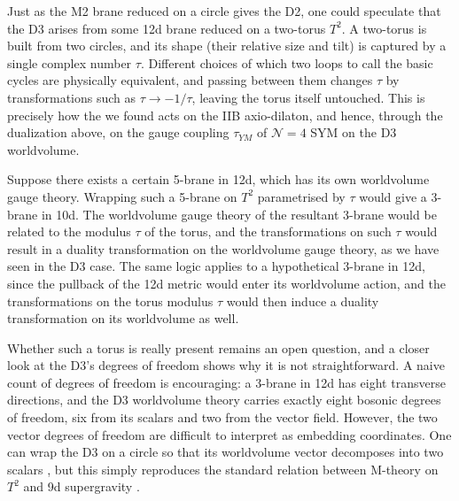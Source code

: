 Just as the M2 brane reduced on a circle gives the D2, one could speculate that the D3 arises from some 12d brane reduced on a two-torus $T^2$.
A two-torus is built from two circles, and its shape (their relative size and tilt) is captured by a single complex number $\tau$.
Different choices of which two loops to call the basic cycles are physically equivalent, and passing between them changes $\tau$ by \SLZ{} transformations such as $\tau\to-1/\tau$, leaving the torus itself untouched.
This is precisely how the \SLZ{} we found acts on the IIB axio-dilaton, and hence, through the dualization above, on the gauge coupling $\tau_{YM}$ of $\mathcal{N}=4$ SYM on the D3 worldvolume.

Suppose there exists a certain 5-brane in 12d, which has its own worldvolume gauge theory.
Wrapping such a 5-brane on $T^2$ parametrised by $\tau$ would give a 3-brane in 10d.
The worldvolume gauge theory of the resultant 3-brane would be related to the modulus $\tau$ of the torus, and the \SLZ{} transformations on such $\tau$ would result in a duality transformation on the worldvolume gauge theory, as we have seen in the D3 case.
The same logic applies to a hypothetical 3-brane in 12d, since the pullback of the 12d metric would enter its worldvolume action, and the \SLZ{} transformations on the torus modulus $\tau$ would then induce a duality transformation on its worldvolume as well.

Whether such a torus is really present remains an open question, and a closer look at the D3's degrees of freedom shows why it is not straightforward.
A naive count of degrees of freedom is encouraging: a 3-brane in 12d has eight transverse directions, and the D3 worldvolume theory carries exactly eight bosonic degrees of freedom, six from its scalars and two from the vector field.
However, the two vector degrees of freedom are difficult to interpret as embedding coordinates.
One can wrap the D3 on a circle so that its worldvolume vector decomposes into two scalars \cite{Jatkar:1996np,Kar:1997cx}, but this simply reproduces the standard relation between M-theory on $T^2$ and 9d supergravity \cite{Green:1997as}.


